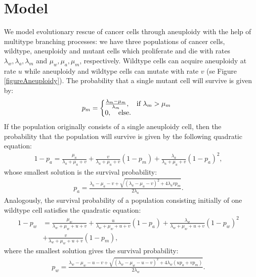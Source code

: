 \documentclass[11pt,a4paper]{article}
\begin{document}
\section{Model}
We model evolutionary rescue of cancer cells through aneuploidy with the help of multitype branching processes: we have three populations of cancer cells, wildtype, aneuploidy and mutant cells which proliferate and die with rates $\lambda_w,  \lambda_a,  \lambda_m$ and $\mu_w, \mu_a, \mu_m$, respectively. Wildtype cells can acquire aneuploidy at rate $u$ while aneuploidy and wildtype cells can mutate with rate $v$ (se Figure \ref{figureAneuploidy}). The probability that a single mutant cell will survive is given by\cite{allen2010introduction}:
\begin{equation}
p_m=\left\{
  \begin{array}{@{}ll@{}}
  \frac{\lambda_m-\mu_m}{\lambda_m},\quad\text{if }\lambda_m>\mu_m \\
   0,\quad\text{else}.
  \end{array}\right.
  \end{equation}
 If the population originally consists of a single aneuploidy cell, then the probability that the population will survive is given by the following quadratic equation:
\begin{align}
1-p_a=\frac{\mu_a}{\lambda_a+\mu_a+v}+\frac{v}{\lambda_a+\mu_a+v}\left(1-p_m\right)+\frac{\lambda_a}{\lambda_a+\mu_a+v}\left(1-p_a\right)^2,
\end{align}
whose smallest solution is the survival probability:
\begin{align}\label{survproba}
p_a=\frac{\lambda_a-\mu_a-v+\sqrt{\left(\lambda_a-\mu_a-v\right)^2+4\lambda_avp_m}}{2\lambda_a}.
\end{align}
Analogously, the survival probability of a population consisting initially of one wildtype cell satisfies the quadratic equation:
\begin{align}\nonumber
1-p_w&=\frac{\mu_w}{\lambda_w+\mu_w+u+v}+\frac{u}{\lambda_w+\mu_w+u+v}\left(1-p_a\right)+\frac{\lambda_w}{\lambda_w+\mu_w+u+v}\left(1-p_w\right)^2\\
&+\frac{v}{\lambda_w+\mu_w+u+v}\left(1-p_m\right),
\end{align}
where the smallest solution gives the survival probability:
\begin{align}\label{survprobw}
p_w=\frac{\lambda_w-\mu_w-u-v+\sqrt{\left(\lambda_w-\mu_w-u-v\right)^2+4\lambda_w\left(up_a+vp_m\right)}}{2\lambda_w}.
\end{align}
\end{document}
